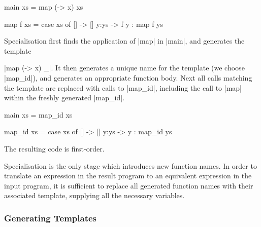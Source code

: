 \begin{example}
\label{ex:map_id}
\begin{code}
main xs = map (\x -> x) xs

map f xs = case  xs of
                 []    -> []
                 y:ys  -> f y : map f ys
\end{code}

Specialisation first finds the application of |map| in |main|, and generates the template \ignore|map (\x -> x) _|. It then generates a unique name for the template (we choose |map_id|), and generates an appropriate function body. Next all calls matching the template are replaced with calls to |map_id|, including the call to |map| within the freshly generated |map_id|.

\begin{code}
main xs = map_id xs

map_id xs = case  xs of
                  []    -> []
                  y:ys  -> y : map_id ys
\end{code}

\noindent The resulting code is first-order.
\end{example}

Specialisation is the only stage which introduces new function names. In order to translate an expression in the result program to an equivalent expression in the input program, it is sufficient to replace all generated function names with their associated template, supplying all the necessary variables.

\subsubsection{Generating Templates}
\label{sec:generate_templates}


